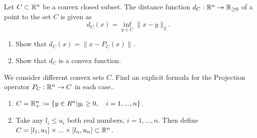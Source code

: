 \documentclass{ExerciseSheet}
\newif\ifsolutions
\begin{document}

\begin{problem}Let $C\subset \mathbb{R}^n$ be a convex closed subset. The distance function $d_C:\mathbb{R}^n\rightarrow \mathbb{R}_{\geq 0}$ of a point to the set $C$ is given as 
\begin{equation*}
    d_C(x)=\inf_{y\in C} \|x-y\|_2.
\end{equation*}
\begin{enumerate}
    \item Show that $d_C(x)= \|x-P_C(x)\|$.
    \item Show that $d_C$ is a convex function. 
\end{enumerate}
\end{problem}

\ifsolutions
\vskip 0.3cm

\begin{solution}
\begin{enumerate}
    \item Theorem 3.5 (norm and normed square have the same minimizer).
    \item Let $x, y \in \R^n$ and $\lambda \in (0,1)$, define $v:= P_C(x)$ and $w:=P_C(y)$. Because $C$ is convex also $\lambda v + (1-\lambda )w \in C.$ 
    \begin{align*}
        d_C(\lambda x + (1-\lambda) y) &= \inf_{c \in C} \|\lambda x + (1-\lambda) y - c\|_2 \\
        & \leq \|\lambda x + (1-\lambda) y - \left( \lambda v + (1-\lambda )w\right)\|_2 \\
        & = \|\lambda (x-v) + (1-\lambda) (y-w) \|_2 \|\\
        &\leq \lambda \|x-v\|_2 + (1-\lambda) \|y-w\|_2 \\
        &= \lambda d_c(x) + (1-\lambda) d_c(y).
    \end{align*}
\end{enumerate}

\end{solution}

\fi

\vskip 0.5cm
\begin{problem}
We consider different convex sets $C$. Find an explicit formula for the Projection operator $P_C:\mathbb{R}^n \rightarrow C$ in each case.. 
	\begin{enumerate}
	    \item $C=\mathbb{R}^n_+ := \{y \in R^n | y_i\geq 0, \quad  i=1,...,n\}$.
     \item Take any $l_i\leq u_i$ both real numbers, $i=1,...,n$. Then define $C= [l_1, u_1]\times ... \times [l_n, u_n] \subset \mathbb{R}^n$.
	\end{enumerate}
\end{problem}
\end{document}
